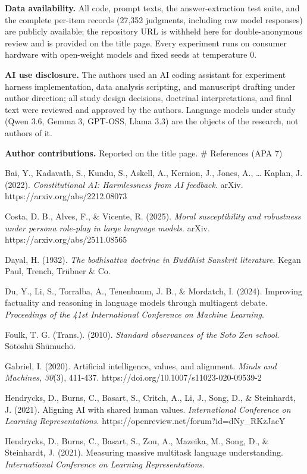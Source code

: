 \documentclass[
  11pt,
]{article}
\begin{document}
\textbf{Data availability.} All code, prompt texts, the
answer-extraction test suite, and the complete per-item records (27,352
judgments, including raw model responses) are publicly available; the
repository URL is withheld here for double-anonymous review and is
provided on the title page. Every experiment runs on consumer hardware
with open-weight models and fixed seeds at temperature 0.

\textbf{AI use disclosure.} The authors used an AI coding assistant for
experiment harness implementation, data analysis scripting, and
manuscript drafting under author direction; all study design decisions,
doctrinal interpretations, and final text were reviewed and approved by
the authors. Language models under study (Qwen 3.6, Gemma 3, GPT-OSS,
Llama 3.3) are the objects of the research, not authors of it.

\textbf{Author contributions.} Reported on the title page. \# References
(APA 7)

Bai, Y., Kadavath, S., Kundu, S., Askell, A., Kernion, J., Jones, A.,
\ldots{} Kaplan, J. (2022). \emph{Constitutional AI: Harmlessness from
AI feedback}. arXiv. https://arxiv.org/abs/2212.08073

Costa, D. B., Alves, F., \& Vicente, R. (2025). \emph{Moral
susceptibility and robustness under persona role-play in large language
models}. arXiv. https://arxiv.org/abs/2511.08565

Dayal, H. (1932). \emph{The bodhisattva doctrine in Buddhist Sanskrit
literature}. Kegan Paul, Trench, Trübner \& Co.

Du, Y., Li, S., Torralba, A., Tenenbaum, J. B., \& Mordatch, I. (2024).
Improving factuality and reasoning in language models through multiagent
debate. \emph{Proceedings of the 41st International Conference on
Machine Learning}.

Foulk, T. G. (Trans.). (2010). \emph{Standard observances of the Soto
Zen school}. Sōtōshū Shūmuchō.

Gabriel, I. (2020). Artificial intelligence, values, and alignment.
\emph{Minds and Machines, 30}(3), 411-437.
https://doi.org/10.1007/s11023-020-09539-2

Hendrycks, D., Burns, C., Basart, S., Critch, A., Li, J., Song, D., \&
Steinhardt, J. (2021). Aligning AI with shared human values.
\emph{International Conference on Learning Representations}.
https://openreview.net/forum?id=dNy\_RKzJacY

Hendrycks, D., Burns, C., Basart, S., Zou, A., Mazeika, M., Song, D., \&
Steinhardt, J. (2021). Measuring massive multitask language
understanding. \emph{International Conference on Learning
Representations}.
\end{document}
